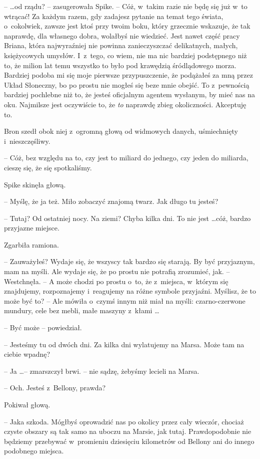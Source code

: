 \documentclass[oneside,polish,11pt,rmheadings]{mwbk}
\begin{document}
--  \ldots  od rządu? -- zasugerowała Spike. -- Cóż, w~takim razie nie będę się już w~to wtrącać! Za każdym razem, gdy zadajesz pytanie na temat tego świata, o~cokolwiek, zawsze jest ktoś przy twoim boku, który grzecznie wskazuje, że tak naprawdę, dla własnego dobra, wolałbyś nie wiedzieć. Jest nawet część pracy Briana, która najwyraźniej nie powinna zanieczyszczać delikatnych, małych, księżycowych umysłów. I~z~tego, co wiem, nie ma nic bardziej podstępnego niż to, że milion lat temu wszystko to było pod krawędzią śródlądowego morza. Bardziej podoba mi się moje pierwsze przypuszczenie, że podążałeś za mną przez Układ Słoneczny, bo po prostu nie mogłeś się beze mnie obejść. To z~pewnością bardziej pochlebne niż to, że jesteś oficjalnym agentem wysłanym, by mieć nas na oku. Najmilsze jest oczywiście to, że \textit{to } naprawdę zbieg okoliczności. Akceptuję to. 

Bron szedł obok niej z~ogromną głową od widmowych danych, uśmiechnięty i~nieszczęśliwy. 

-- Cóż, bez względu na to, czy jest to miliard do jednego, czy jeden do miliarda, cieszę się, że się spotkaliśmy. 

Spike skinęła głową. 

-- Myślę, że ja też. Miło zobaczyć znajomą twarz. Jak długo tu jesteś? 

-- Tutaj? Od ostatniej nocy. Na ziemi? Chyba kilka dni. To nie jest \ldots  cóż, bardzo przyjazne miejsce. 

Zgarbiła ramiona. 

-- Zauważyłeś? Wydaje się, że wszyscy tak bardzo się starają. By być przyjaznym, mam na myśli. Ale wydaje się, że po prostu nie potrafią zrozumieć, jak. -- Westchnęła. -- A może chodzi po prostu o~to, że z~miejsca, w~którym się znajdujemy, rozpoznajemy i~reagujemy na różne symbole przyjaźni. Myślisz, że to może być to? -- Ale mówiła o~czymś innym niż miał na myśli: czarno-czerwone mundury, cele bez mebli, małe maszyny z~kłami \ldots  

-- Być może -- powiedział. 

-- Jesteśmy tu od dwóch dni. Za kilka dni wylatujemy na Marsa. Może tam na ciebie wpadnę? 

-- Ja \ldots  -- zmarszczył brwi. -- nie sądzę, żebyśmy lecieli na Marsa. 

-- Och. Jesteś z~Bellony, prawda? 

Pokiwał głową. 

-- Jaka szkoda. Mógłbyś oprowadzić nas po okolicy przez cały wieczór, chociaż czyste obszary są tak samo na uboczu na Marsie, jak tutaj. Prawdopodobnie nie będziemy przebywać w~promieniu dziesięciu kilometrów od Bellony ani do innego podobnego miejsca. 
\end{document}

